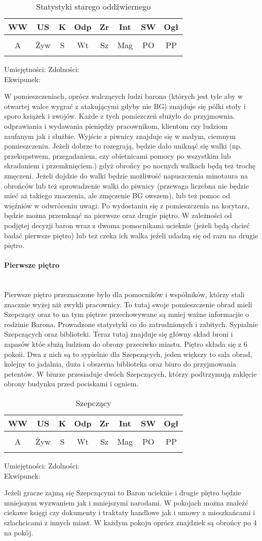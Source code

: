 \documentclass{article}
\newcommand{\whtable}[1]{
    \begin{table}[H]
        \caption{{#1}}
        \vspace{4pt}
        \centering
            \begin{tabular}{|c|c|c|c|c|c|c|c|}
                \hline
                WW & US & K & Odp & Zr & Int & SW & Ogł \\ \hline
                 &  &  &  &  &  &  &  \\ \hline
                A & Żyw & S & Wt & Sz & Mag & PO & PP \\ \hline
                 &  &  &  &  &  &  &  \\ \hline
                \end{tabular}
    \end{table}

    \noindent
    Umiejętności:
    \hspace{150pt}
    Zdolności:
    \vspace{50pt}\\
    Ekwipunek:
    \vspace{50pt}
}
\begin{document}
\whtable{Statystyki starego oddźwiernego}

W pomieszczeniach, oprócz walczących ludzi barona (których jest tyle aby w otwartej walce wygrać z atakującymi gdyby nie BG) znajduje się pólki stoły i sporo książek i zwojów. Każde z tych pomiezczeń służyło do przyjmownia. odprawiania i wydawania pieniędzy pracownikom, klientom czy ludziom zaufanym jak i służbie. Wyjście z piwnicy znajduje się w małym, ciemnym pomieszczeniu. Jeżeli dobrze to rozegrają, będzie dało uniknąć się walki (np. przekupstwem, przegadaniem, czy obietnicami pomocy po wszystkim lub skradaniem i przemknięciem.) gdyż obrońcy po nocnych walkach będą też trochę zmęczeni. Jeżeli dojdzie do walki będzie możliwość napuszczenia minotaura na obrońców lub też sprowadzenie walki do piwnicy (przewaga liczebna nie będzie mieć aż takiego znaczenia, ale zmęczenie BG owszem), lub też pomoc od więźniów w odwróceniu uwagi. Po wydostaniu się z pomieszczenia na korytarz, będzie można przemknąć na pierwsze oraz drugie piętro. W zależności od podjętej decyzji baron wraz z dwoma pomocnikami ucieknie (jeżeli będą chcieć badać pierwsze piętro) lub też czeka ich walka jeżeli udadzą się od razu na drugie piętro. 

\paragraph{\Large{Pierwsze piętro}}\mbox{}\\

Pierwsze piętro przeznaczone było dla pomocników i wspólników, którzy stali znacznie wyżej niż zwykli pracownicy. To tutaj swoje pomieszczenie obrad mieli Szepczący oraz to na tym piętrze przechowywane są mniej ważne informacjie o rodzinie Barona. Prowadzone statystyki co do zatrudnionych i zabitych. Sypialnie Szepczących oraz biblioteki. Teraz tutaj znajduje się główny skład broni i zapasów któe służą ludziom do obrony przeciwko miastu. Piętro składa się z 6 pokoii. Dwa z nich są to sypielnie dla Szepczących, jeden większy to sala obrad, kolejny to jadalnia, duża i obszerna biblioteka oraz biuro do przyjmowania petentów. W biurze przesiaduje dwóch Szepczących, którzy podtrzymują zaklęcie obrony budynku przed pociskami i ogniem. 

\whtable{Szepczący}

Jeżeli gracze zajmą się Szepczącymi to Baron ucieknie i drugie piętro będzie mniejszym wyzwaniem jak i mniejszymi narodami. W pokojach można znaleźć ciekawe księgi czy dokumenty i traktaty handlowe jak i umowy z mieszkańcami i szlachcicami z innych miast. W każdym pokoju oprócz znajdziek są obrońcy po 4 na pokój. 
\end{document}
